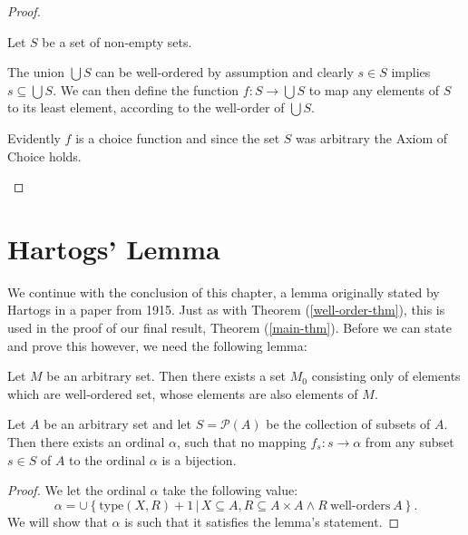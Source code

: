 \documentclass[../../main.tex]{subfiles}
\begin{document}
\begin{proof}
\begin{enumerate}
        Let $S$ be a set of non-empty sets.

        The union $\bigcup S$ can be well-ordered by assumption and clearly $s \in S$ implies $s \subseteq \bigcup S$.
        We can then define the function $f: S \to \bigcup S$ to map any elements of $S$ to its least element, according to the well-order of $\bigcup S$.
        
        Evidently $f$ is a choice function and since the set $S$ was arbitrary the Axiom of Choice holds. \qedhere
    \end{enumerate}
\end{proof}

\section{Hartogs' Lemma}\label{hartogs-lemma-section}
We continue with the conclusion of this chapter, a lemma originally stated by Hartogs in a paper from 1915. %
Just as with Theorem (\ref{well-order-thm}), this is used in the proof of our final result, Theorem (\ref{main-thm}).
Before we can state and prove this however, we need the following lemma:

\begin{lemma}\cite[Annex]{Har15}
    Let $M$ be an arbitrary set.
    Then there exists a set $M_0$ consisting only of elements which are well-ordered set, whose elements are also elements of $M$.
\end{lemma}

\begin{lemma}\cite{Har15}\label{hartogs-lemma}\cite[Lemma]{Haj72}
    Let $A$ be an arbitrary set and let $S = \mathcal{P}(A)$ be the collection of subsets of $A$.
    Then there exists an ordinal $\alpha$, such that no mapping $f_s: s \to \alpha$ from any subset $s \in S$ of $A$ to the ordinal $\alpha$ is a bijection.
\end{lemma}

\begin{proof}
    We let the ordinal $\alpha$ take the following value:
    $$\alpha = \cup\left\{ \text{type}\left(X, R\right) + 1 \,\vert\, X \subseteq A, R \subseteq A \times A \wedge R\ \text{well-orders}\ A\right\}.$$
    We will show that $\alpha$ is such that it satisfies the lemma's statement.

\end{proof}
\end{document}
